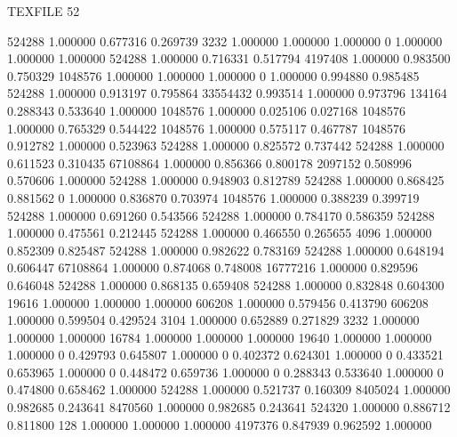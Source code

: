 TEXFILE
52

524288 1.000000 0.677316 0.269739
3232 1.000000 1.000000 1.000000
0 1.000000 1.000000 1.000000
524288 1.000000 0.716331 0.517794
4197408 1.000000 0.983500 0.750329
1048576 1.000000 1.000000 1.000000
0 1.000000 0.994880 0.985485
524288 1.000000 0.913197 0.795864
33554432 0.993514 1.000000 0.973796
134164 0.288343 0.533640 1.000000
1048576 1.000000 0.025106 0.027168
1048576 1.000000 0.765329 0.544422
1048576 1.000000 0.575117 0.467787
1048576 0.912782 1.000000 0.523963
524288 1.000000 0.825572 0.737442
524288 1.000000 0.611523 0.310435
67108864 1.000000 0.856366 0.800178
2097152 0.508996 0.570606 1.000000
524288 1.000000 0.948903 0.812789
524288 1.000000 0.868425 0.881562
0 1.000000 0.836870 0.703974
1048576 1.000000 0.388239 0.399719
524288 1.000000 0.691260 0.543566
524288 1.000000 0.784170 0.586359
524288 1.000000 0.475561 0.212445
524288 1.000000 0.466550 0.265655
4096 1.000000 0.852309 0.825487
524288 1.000000 0.982622 0.783169
524288 1.000000 0.648194 0.606447
67108864 1.000000 0.874068 0.748008
16777216 1.000000 0.829596 0.646048
524288 1.000000 0.868135 0.659408
524288 1.000000 0.832848 0.604300
19616 1.000000 1.000000 1.000000
606208 1.000000 0.579456 0.413790
606208 1.000000 0.599504 0.429524
3104 1.000000 0.652889 0.271829
3232 1.000000 1.000000 1.000000
16784 1.000000 1.000000 1.000000
19640 1.000000 1.000000 1.000000
0 0.429793 0.645807 1.000000
0 0.402372 0.624301 1.000000
0 0.433521 0.653965 1.000000
0 0.448472 0.659736 1.000000
0 0.288343 0.533640 1.000000
0 0.474800 0.658462 1.000000
524288 1.000000 0.521737 0.160309
8405024 1.000000 0.982685 0.243641
8470560 1.000000 0.982685 0.243641
524320 1.000000 0.886712 0.811800
128 1.000000 1.000000 1.000000
4197376 0.847939 0.962592 1.000000